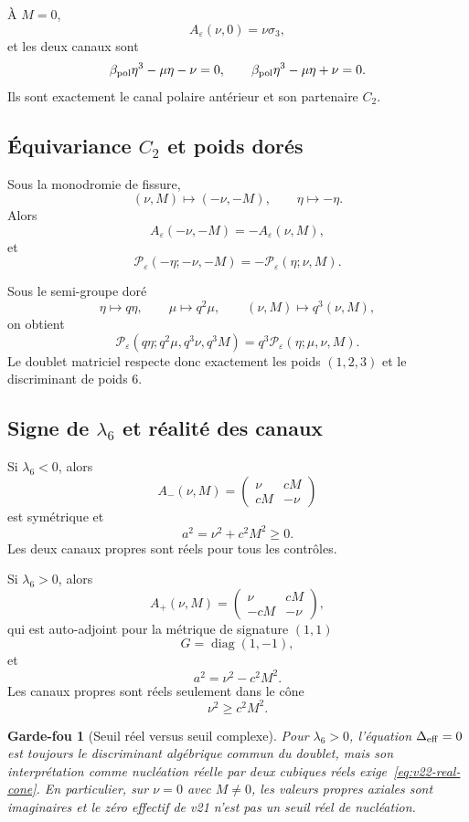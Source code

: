 \documentclass[11pt,a4paper]{article}
\newtheorem{guardrail}[theorem]{Garde-fou}
\begin{document}
À $M=0$,
\[
A_\varepsilon(\nu,0)
=
\nu\sigma_3,
\]
et les deux canaux sont
\[
\beta_{\rm pol}\eta^3-\mu\eta-\nu=0,
\qquad
\beta_{\rm pol}\eta^3-\mu\eta+\nu=0.
\]
Ils sont exactement le canal polaire antérieur et son partenaire $C_2$.

\subsection{Équivariance \texorpdfstring{$C_2$}{C2} et poids dorés}

Sous la monodromie de fissure,
\[
(\nu,M)\mapsto(-\nu,-M),
\qquad
\eta\mapsto-\eta.
\]
Alors
\[
A_\varepsilon(-\nu,-M)
=
-A_\varepsilon(\nu,M),
\]
et
\[
\boxed{
\mathcal P_\varepsilon(-\eta;-\nu,-M)
=
-\mathcal P_\varepsilon(\eta;\nu,M).}
\]

Sous le semi-groupe doré
\[
\eta\mapsto q\eta,
\qquad
\mu\mapsto q^2\mu,
\qquad
(\nu,M)\mapsto q^3(\nu,M),
\]
on obtient
\[
\boxed{
\mathcal P_\varepsilon
(q\eta;q^2\mu,q^3\nu,q^3M)
=
q^3
\mathcal P_\varepsilon(\eta;\mu,\nu,M).}
\]
Le doublet matriciel respecte donc exactement les poids $(1,2,3)$ et le discriminant de poids $6$.

\subsection{Signe de \texorpdfstring{$\lambda_6$}{lambda6} et réalité des canaux}

Si $\lambda_6<0$, alors
\[
A_-(\nu,M)
=
\begin{pmatrix}
\nu&cM\\
cM&-\nu
\end{pmatrix}
\]
est symétrique et
\[
a^2=\nu^2+c^2M^2\ge0.
\]
Les deux canaux propres sont réels pour tous les contrôles.

Si $\lambda_6>0$, alors
\[
A_+(\nu,M)
=
\begin{pmatrix}
\nu&cM\\
-cM&-\nu
\end{pmatrix},
\]
qui est auto-adjoint pour la métrique de signature $(1,1)$
\[
G=\operatorname{diag}(1,-1),
\]
et
\[
a^2=\nu^2-c^2M^2.
\]
Les canaux propres sont réels seulement dans le cône
\begin{equation}\label{eq:v22-real-cone}
\boxed{
\nu^2\ge c^2M^2.}
\end{equation}

\begin{guardrail}[Seuil réel versus seuil complexe]
Pour $\lambda_6>0$, l'équation $\Delta_{\rm eff}=0$ est toujours le discriminant algébrique commun du doublet, mais son interprétation comme nucléation réelle par deux cubiques réels exige~\eqref{eq:v22-real-cone}. En particulier, sur $\nu=0$ avec $M\neq0$, les valeurs propres axiales sont imaginaires et le zéro effectif de v21 n'est pas un seuil réel de nucléation.
\end{guardrail}
\end{document}
